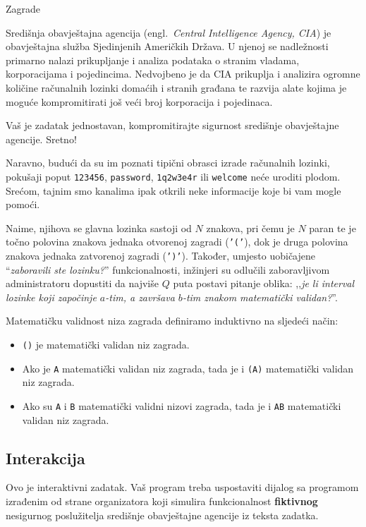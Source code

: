 \begin{statement}[
  problempoints=100,
  timelimit=1 sekunda,
  memorylimit=512 MiB,
]{Zagrade}

Središnja obavještajna agencija (engl.\ \textit{Central Intelligence Agency,
CIA}) je obavještajna služba Sjedinjenih Američkih Država. U njenoj se
nadležnosti primarno nalazi prikupljanje i analiza podataka o stranim
vladama, korporacijama i pojedincima. Nedvojbeno je da CIA prikuplja i analizira
ogromne količine računalnih lozinki domaćih i stranih građana te razvija alate
kojima je moguće kompromitirati još veći broj korporacija i pojedinaca.

Vaš je zadatak jednostavan, kompromitirajte sigurnost središnje obavještajne
agencije. Sretno!

Naravno, budući da su im poznati tipični obrasci izrade računalnih lozinki,
pokušaji poput \texttt{123456}, \texttt{password}, \texttt{1q2w3e4r} ili
\texttt{welcome} neće uroditi plodom. Srećom, tajnim smo kanalima ipak otkrili
neke informacije koje bi vam mogle pomoći.

Naime, njihova se glavna lozinka sastoji od $N$ znakova, pri čemu je $N$ paran
te je točno polovina znakova jednaka otvorenoj zagradi (\texttt{'('}), dok je
druga polovina znakova jednaka zatvorenoj zagradi (\texttt{')'}). Također,
  umjesto uobičajene ``\textit{zaboravili ste lozinku?}'' funkcionalnosti,
inžinjeri su odlučili zaboravljivom administratoru dopustiti da
najviše $Q$ puta postavi pitanje oblika: ,,\textit{je li interval lozinke koji
započinje $a$-tim, a završava $b$-tim znakom matematički validan?}''.

Matematičku validnost niza zagrada definiramo induktivno na sljedeći način:

\begin{itemize}
  \item \texttt{()} je matematički validan niz zagrada.
  \item Ako je \texttt{A} matematički validan niz zagrada, tada je i
        \texttt{(A)} matematički validan niz zagrada.
  \item Ako su \texttt{A} i \texttt{B} matematički validni nizovi zagrada,
        tada je i \texttt{AB} matematički validan niz zagrada.
\end{itemize}

\subsection*{Interakcija}
Ovo je interaktivni zadatak. Vaš program treba uspostaviti dijalog sa programom
izrađenim od strane organizatora koji simulira funkcionalnost
\textbf{fiktivnog} nesigurnog poslužitelja središnje obavještajne agencije iz
teksta zadatka.


\end{statement}
